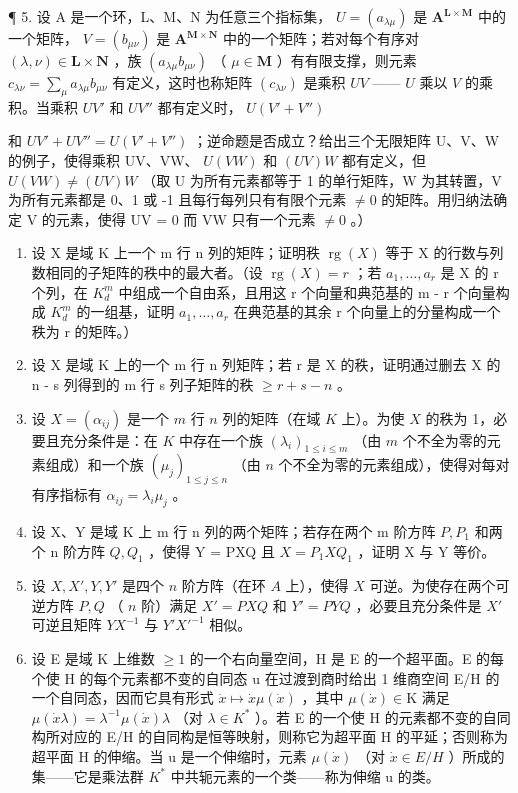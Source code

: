 ¶ 5. 设 A 是一个环，L、M、N 为任意三个指标集， \(U = (a_{\lambda \mu})\) 是 \(\mathbf{A}^{\mathbf{L} \times \mathbf{M}}\) 中的一个矩阵， \(V = (b_{\mu \nu})\) 是 \(\mathbf{A}^{\mathbf{M} \times \mathbf{N}}\) 中的一个矩阵；若对每个有序对 \((\lambda, \nu) \in \mathbf{L} \times \mathbf{N}\) ，族 \((a_{\lambda \mu} b_{\mu \nu})\) （ \(\mu \in \mathbf{M}\) ）有有限支撑，则元素 \(c_{\lambda \nu} = \sum_{\mu} a_{\lambda \mu} b_{\mu \nu}\) 有定义，这时也称矩阵 \((c_{\lambda \nu})\) 是乘积 \(UV\) —— \(U\) 乘以 \(V\) 的乘积。当乘积 \(UV'\) 和 \(UV''\) 都有定义时， \(U(V' + V'')\)

和 \(UV' + UV'' = U(V' + V'')\) ；逆命题是否成立？给出三个无限矩阵 U、V、W 的例子，使得乘积 UV、VW、 \(U(VW)\) 和 \((UV)W\) 都有定义，但 \(U(VW) \neq (UV)W\) （取 U 为所有元素都等于 1 的单行矩阵，W 为其转置，V 为所有元素都是 0、1 或 -1 且每行每列只有有限个元素 \(\neq 0\) 的矩阵。用归纳法确定 V 的元素，使得 UV = 0 而 VW 只有一个元素 \(\neq 0\) 。）

\begin{enumerate}
\def\labelenumi{\arabic{enumi}.}
\setcounter{enumi}{5}
\item
  设 X 是域 K 上一个 m 行 n 列的矩阵；证明秩 \(\operatorname{rg}(X)\) 等于 X 的行数与列数相同的子矩阵的秩中的最大者。（设 \(\operatorname{rg}(X) = r\) ；若 \(a_{1}, \ldots, a_{r}\) 是 X 的 r 个列，在 \(K_{d}^{m}\) 中组成一个自由系，且用这 r 个向量和典范基的 m - r 个向量构成 \(K_{d}^{m}\) 的一组基，证明 \(a_{1}, \ldots, a_{r}\) 在典范基的其余 r 个向量上的分量构成一个秩为 r 的矩阵。）
\item
  设 X 是域 K 上的一个 m 行 n 列矩阵；若 r 是 X 的秩，证明通过删去 X 的 n - s 列得到的 m 行 s 列子矩阵的秩 \(\geqslant r + s - n\) 。
\item
  设 \(X = (\alpha_{ij})\) 是一个 \(m\) 行 \(n\) 列的矩阵（在域 \(K\) 上）。为使 \(X\) 的秩为 1，必要且充分条件是：在 \(K\) 中存在一个族 \((\lambda_i)_{1 \leqslant i \leqslant m}\) （由 \(m\) 个不全为零的元素组成）和一个族 \((\mu_j)_{1 \leqslant j \leqslant n}\) （由 \(n\) 个不全为零的元素组成），使得对每对有序指标有 \(\alpha_{ij} = \lambda_i \mu_j\) 。
\item
  设 X、Y 是域 K 上 m 行 n 列的两个矩阵；若存在两个 m 阶方阵 \(P, P_{1}\) 和两个 n 阶方阵 \(Q, Q_{1}\) ，使得 Y = PXQ 且 \(X = P_{1}XQ_{1}\) ，证明 X 与 Y 等价。
\item
  设 \(X, X', Y, Y'\) 是四个 \(n\) 阶方阵（在环 \(A\) 上），使得 \(X\) 可逆。为使存在两个可逆方阵 \(P, Q\) （ \(n\) 阶）满足 \(X' = PXQ\) 和 \(Y' = PYQ\) ，必要且充分条件是 \(X'\) 可逆且矩阵 \(YX^{-1}\) 与 \(Y'X'^{-1}\) 相似。
\item
  设 E 是域 K 上维数 \(\geqslant1\) 的一个右向量空间，H 是 E 的一个超平面。E 的每个使 H 的每个元素都不变的自同态 u 在过渡到商时给出 1 维商空间 E/H 的一个自同态，因而它具有形式 \(\dot{x}\mapsto\dot{x}\mu(\dot{x})\) ，其中 \(\mu(\dot{x})\in\mathrm{K}\) 满足 \(\mu(\dot{x}\lambda)=\lambda^{-1}\mu(\dot{x})\lambda\) （对 \(\lambda\in K^{*}\) ）。若 E 的一个使 H 的元素都不变的自同构所对应的 E/H 的自同构是恒等映射，则称它为超平面 H 的平延；否则称为超平面 H 的伸缩。当 u 是一个伸缩时，元素 \(\mu(\dot{x})\) （对 \(\dot{x}\in E/H\) ）所成的集——它是乘法群 \(K^{*}\) 中共轭元素的一个类——称为伸缩 u 的类。
\end{enumerate}

